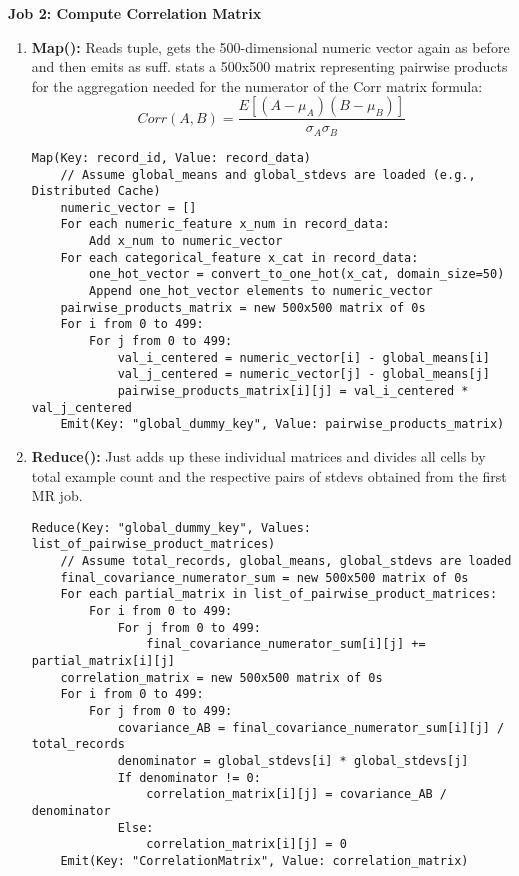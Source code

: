 \documentclass{article}
\begin{document}
\begin{enumerate}[label=\textbf{Question \arabic*.}]
    \textbf{Job 2: Compute Correlation Matrix}
    \begin{enumerate}[label=(\alph*)]
    \item \textbf{Map():} Reads tuple, gets the 500-dimensional numeric vector again as before and then emits as suff. stats a 500x500 matrix representing pairwise products for the aggregation needed for the numerator of the Corr matrix formula:
    $$Corr(A,B) = \frac{E[(A-\mu_A)(B-\mu_B)]}{\sigma_A \sigma_B}$$
        \begin{lstlisting}
Map(Key: record_id, Value: record_data)
    // Assume global_means and global_stdevs are loaded (e.g., Distributed Cache)
    numeric_vector = []
    For each numeric_feature x_num in record_data:
        Add x_num to numeric_vector
    For each categorical_feature x_cat in record_data:
        one_hot_vector = convert_to_one_hot(x_cat, domain_size=50)
        Append one_hot_vector elements to numeric_vector
    pairwise_products_matrix = new 500x500 matrix of 0s
    For i from 0 to 499:
        For j from 0 to 499:
            val_i_centered = numeric_vector[i] - global_means[i]
            val_j_centered = numeric_vector[j] - global_means[j]
            pairwise_products_matrix[i][j] = val_i_centered * val_j_centered
    Emit(Key: "global_dummy_key", Value: pairwise_products_matrix)
        \end{lstlisting}
    \item \textbf{Reduce():} Just adds up these individual matrices and divides all cells by total example count and the respective pairs of stdevs obtained from the first MR job.
        \begin{lstlisting}
Reduce(Key: "global_dummy_key", Values: list_of_pairwise_product_matrices)
    // Assume total_records, global_means, global_stdevs are loaded
    final_covariance_numerator_sum = new 500x500 matrix of 0s
    For each partial_matrix in list_of_pairwise_product_matrices:
        For i from 0 to 499:
            For j from 0 to 499:
                final_covariance_numerator_sum[i][j] += partial_matrix[i][j]
    correlation_matrix = new 500x500 matrix of 0s
    For i from 0 to 499:
        For j from 0 to 499:
            covariance_AB = final_covariance_numerator_sum[i][j] / total_records
            denominator = global_stdevs[i] * global_stdevs[j]
            If denominator != 0:
                correlation_matrix[i][j] = covariance_AB / denominator
            Else:
                correlation_matrix[i][j] = 0
    Emit(Key: "CorrelationMatrix", Value: correlation_matrix)
        \end{lstlisting}
    \end{enumerate}


\end{enumerate}
\end{document}
